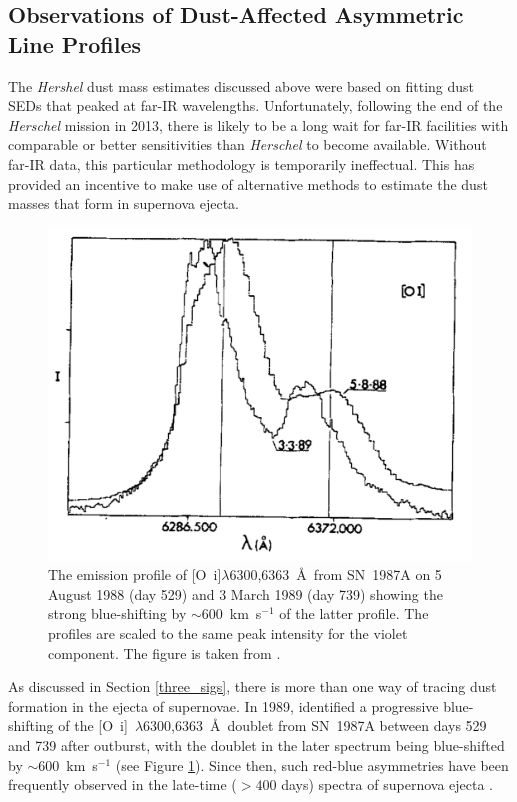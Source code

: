  \subsection{Observations of Dust-Affected Asymmetric Line Profiles}

The {\em Hershel} dust mass estimates discussed above were based on fitting dust SEDs that peaked at far-IR wavelengths. Unfortunately, following the end of the {\em Herschel} mission in 2013, there is likely to be a long wait for far-IR facilities with comparable or better sensitivities than {\em Herschel} to become available.  Without far-IR data, this particular methodology is temporarily ineffectual.  This has provided an incentive to make use of alternative methods to estimate the dust masses that form in supernova ejecta.

\begin{figure}
\centering
\includegraphics[clip=true,scale=0.45,trim= 0 0 0 0,angle=1]{chapters/chapter1/figs/LucyOI.png}
\caption{The emission profile of [O~{\sc i}]$\lambda$6300,6363~\AA\ from SN~1987A on 5 August 1988 (day 529) and 3 March 1989 (day 739) showing the strong blue-shifting by $\sim600 $~km~s$^{-1}$ of the latter profile.  The profiles are scaled to the same peak intensity for the violet component.  The figure is taken from \citet{Lucy1989}.}
\label{fig:Lucy_orig}
\end{figure}


As discussed in Section \ref{three_sigs}, there is more than one way of tracing dust formation in the ejecta of supernovae.  In 1989, \citeauthor{Lucy1989} identified a progressive blue-shifting of the [O~{\sc i}]~$\lambda$6300,6363~\AA\ doublet from SN~1987A between days 529 and 739 after outburst, with the doublet in the later spectrum being blue-shifted by $\sim600 $~km~s$^{-1}$ (see Figure \ref{fig:Lucy_orig}). Since then, such red-blue asymmetries have been frequently observed in the late-time ($ > 400$ days) spectra of supernova ejecta  .

